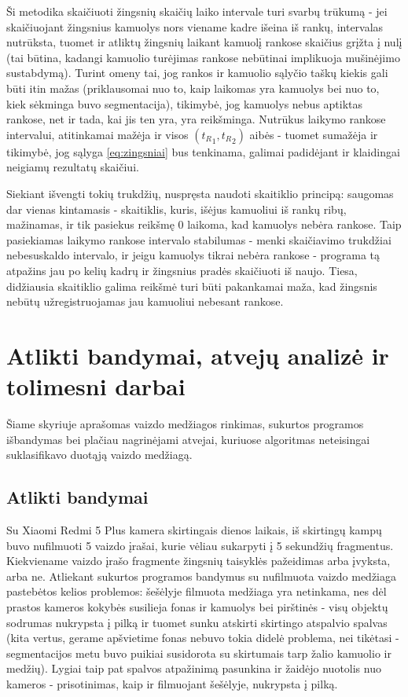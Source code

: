 \documentclass{VUMIFPSkursinis}
\begin{document}
Ši metodika skaičiuoti žingsnių skaičių laiko intervale turi svarbų trūkumą - jei skaičiuojant žingsnius kamuolys nors viename kadre išeina iš rankų, intervalas nutrūksta, tuomet ir atliktų žingsnių laikant kamuolį rankose skaičius grįžta į nulį (tai būtina, kadangi kamuolio turėjimas rankose nebūtinai implikuoja mušinėjimo sustabdymą). Turint omeny tai, jog rankos ir kamuolio sąlyčio taškų kiekis gali būti itin mažas (priklausomai nuo to, kaip laikomas yra kamuolys bei nuo to, kiek sėkminga buvo segmentacija), tikimybė, jog kamuolys nebus aptiktas rankose, net ir tada, kai jis ten yra, yra reikšminga. Nutrūkus laikymo rankose intervalui, atitinkamai mažėja ir visos $({t_R}_1,{ t_R}_2)$ aibės - tuomet sumažėja ir tikimybė, jog sąlyga \ref{eq:zingsniai} bus tenkinama, galimai padidėjant ir klaidingai neigiamų rezultatų skaičiui.


Siekiant išvengti tokių trukdžių, nuspręsta naudoti skaitiklio principą: saugomas dar vienas kintamasis - skaitiklis, kuris, išėjus kamuoliui iš rankų ribų, mažinamas, ir tik pasiekus reikšmę 0 laikoma, kad kamuolys nebėra rankose. Taip pasiekiamas laikymo rankose intervalo stabilumas - menki skaičiavimo trukdžiai nebesuskaldo intervalo, ir jeigu kamuolys tikrai nebėra rankose - programa tą atpažins jau po kelių kadrų ir žingsnius pradės skaičiuoti iš naujo. Tiesa, didžiausia skaitiklio galima reikšmė turi būti pakankamai maža, kad žingsnis nebūtų užregistruojamas jau kamuoliui nebesant rankose. 

\section{Atlikti bandymai, atvejų analizė ir tolimesni darbai}
Šiame skyriuje aprašomas vaizdo medžiagos rinkimas, sukurtos programos išbandymas bei plačiau nagrinėjami atvejai, kuriuose algoritmas neteisingai suklasifikavo duotąją vaizdo medžiagą. 
\subsection{Atlikti bandymai}
Su Xiaomi Redmi 5 Plus kamera skirtingais dienos laikais, iš skirtingų kampų buvo nufilmuoti 5 vaizdo įrašai, kurie vėliau sukarpyti į 5 sekundžių fragmentus. Kiekviename vaizdo įrašo fragmente žingsnių taisyklės pažeidimas arba įvyksta, arba ne. Atliekant sukurtos programos bandymus su nufilmuota vaizdo medžiaga pastebėtos kelios problemos: šešėlyje filmuota medžiaga yra netinkama, nes dėl prastos kameros kokybės susilieja fonas ir kamuolys bei pirštinės - visų objektų sodrumas nukrypsta į pilką ir tuomet sunku atskirti skirtingo atspalvio spalvas (kita vertus, gerame apšvietime fonas nebuvo tokia didelė problema, nei tikėtasi - segmentacijos metu buvo puikiai susidorota su skirtumais tarp žalio kamuolio ir medžių). Lygiai taip pat spalvos atpažinimą pasunkina ir žaidėjo nuotolis nuo kameros - prisotinimas, kaip ir filmuojant šešėlyje, nukrypsta į pilką. 
\end{document}
